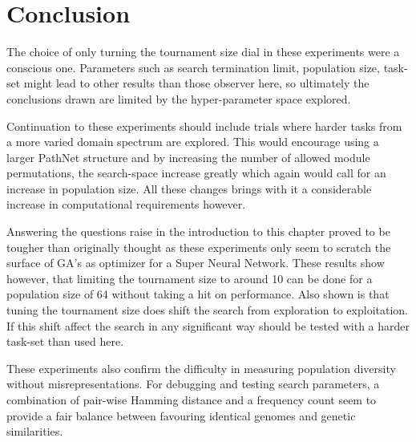 \section{Conclusion}

The choice of only turning the tournament size dial in these experiments were a conscious one. Parameters such as search termination limit, population size, task-set might lead to other results than those observer here, so ultimately the conclusions drawn are limited by the hyper-parameter space explored. 

Continuation to these experiments should include trials where harder tasks from a more varied domain spectrum are explored. This would encourage using a larger PathNet structure and by increasing the number of allowed module permutations, the search-space increase greatly which again would call for an increase in population size. All these changes brings with it a considerable increase in computational requirements however.

Answering the questions raise in the introduction to this chapter proved to be tougher than originally thought as these experiments only seem to scratch the surface of GA's as optimizer for a Super Neural Network. These results show however, that limiting the tournament size to around 10 can be done for a population size of 64 without taking a hit on performance. Also shown is that tuning the tournament size does shift the search from exploration to exploitation. If this shift affect the search in any significant way should be tested with a harder task-set than used here. 

These experiments also confirm the difficulty in measuring population diversity without misrepresentations. For debugging and testing search parameters, a combination of pair-wise Hamming distance and a frequency count seem to provide a fair balance between favouring identical genomes and genetic similarities.  


